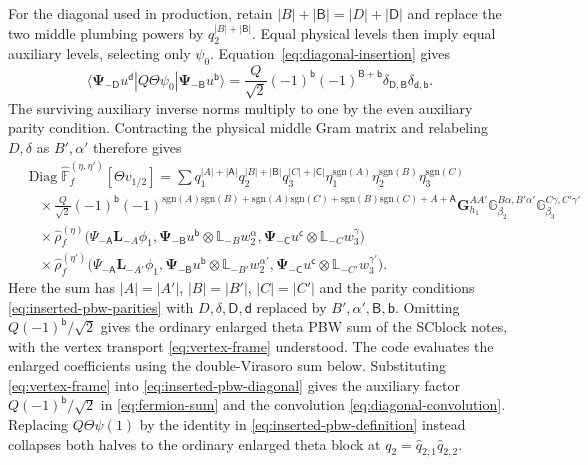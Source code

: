 \documentclass[11pt]{article}
\newcommand{\hFF}{\widehat{\mathbb F}}
\numberwithin{equation}{section}
\begin{document}
For the diagonal used in production, retain
$|B|+|\mathsf B|=|D|+|\mathsf D|$ and replace the two middle plumbing
powers by $q_2^{|B|+|\mathsf B|}$. Equal physical levels then imply
equal auxiliary levels, selecting only $\psi_0$. Equation~\eqref{eq:diagonal-insertion}
gives
\begin{equation}
 \langle\boldsymbol\Psi_{-\mathsf D}u^{\mathsf d}|
 Q\Theta\psi_0|\boldsymbol\Psi_{-\mathsf B}u^{\mathsf b}\rangle
 =\frac Q{\sqrt2}(-1)^{\mathsf b}(-1)^{\mathsf B+\mathsf b}
 \delta_{\mathsf D,\mathsf B}\delta_{\mathsf d,\mathsf b}.
 \label{eq:inserted-pbw-middle}
\end{equation}
The surviving auxiliary inverse norms multiply to one by the even
auxiliary parity condition. Contracting the physical middle Gram matrix
and relabeling $D,\delta$ as $B',\alpha'$ therefore gives
\begin{align}
 &\operatorname{Diag}\hFF_f^{(\eta,\eta')}[\Theta v_{1/2}]
 =\sum
 q_1^{|A|+|\mathsf A|}q_2^{|B|+|\mathsf B|}q_3^{|C|+|\mathsf C|}
 \eta_1^{\mathrm{sgn}(A)}\eta_2^{\mathrm{sgn}(B)}\eta_3^{\mathrm{sgn}(C)}
 \nonumber\\
 &\quad\times
 \frac Q{\sqrt2}(-1)^{\mathsf b}
 (-1)^{\mathrm{sgn}(A)\mathrm{sgn}(B)+\mathrm{sgn}(A)\mathrm{sgn}(C)+
                  \mathrm{sgn}(B)\mathrm{sgn}(C)+A+\mathsf A}
 \mathbf G_{h_1}^{AA'}\mathbb G_{\beta_2}^{B\alpha,B'\alpha'}
 \mathbb G_{\beta_3}^{C\gamma,C'\gamma'}\nonumber\\
 &\quad\times\hat\rho_f^{(\eta)}\bigl(
 \Psi_{-\mathsf A}\mathbf L_{-A}\phi_1,
 \boldsymbol\Psi_{-\mathsf B}u^{\mathsf b}\otimes\mathbb L_{-B}w_2^\alpha,
 \boldsymbol\Psi_{-\mathsf C}u^{\mathsf c}\otimes\mathbb L_{-C}w_3^\gamma\bigr)
 \nonumber\\
 &\quad\times\hat\rho_f^{(\eta')}\bigl(
 \Psi_{-\mathsf A}\mathbf L_{-A'}\phi_1,
 \boldsymbol\Psi_{-\mathsf B}u^{\mathsf b}\otimes\mathbb L_{-B'}w_2^{\alpha'},
 \boldsymbol\Psi_{-\mathsf C}u^{\mathsf c}\otimes\mathbb L_{-C'}w_3^{\gamma'}\bigr).
 \label{eq:inserted-pbw-diagonal}
\end{align}
Here the sum has $|A|=|A'|$, $|B|=|B'|$, $|C|=|C'|$ and the parity
conditions \eqref{eq:inserted-pbw-parities} with
$D,\delta,\mathsf D,\mathsf d$ replaced by
$B',\alpha',\mathsf B,\mathsf b$.
Omitting $Q(-1)^{\mathsf b}/\sqrt2$ gives the ordinary enlarged theta
PBW sum of the SCblock notes, with the vertex transport
\eqref{eq:vertex-frame} understood.
The code evaluates the enlarged coefficients using the double-Virasoro
sum below. Substituting
\eqref{eq:vertex-frame} into \eqref{eq:inserted-pbw-diagonal} gives the
auxiliary factor $Q(-1)^{\mathsf b}/\sqrt2$ in
\eqref{eq:fermion-sum} and the convolution
\eqref{eq:diagonal-convolution}. Replacing $Q\Theta\psi(1)$ by the
identity in \eqref{eq:inserted-pbw-definition} instead collapses both
halves to the ordinary enlarged theta block at
$q_2=\hat q_{2,1}\hat q_{2,2}$.
\end{document}
